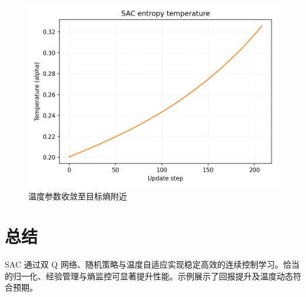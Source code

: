 \documentclass[UTF8,zihao=-4]{ctexart}
\begin{document}
\begin{figure}[H]
  \centering
  \includegraphics[width=0.82\linewidth]{sac_temperature.png}
  \caption{温度参数收敛至目标熵附近}
  \label{fig:sac_temperature_cn}
\end{figure}

\FloatBarrier
\section{总结}
SAC 通过双 Q 网络、随机策略与温度自适应实现稳定高效的连续控制学习。恰当的归一化、经验管理与熵监控可显著提升性能。示例展示了回报提升及温度动态符合预期。
\end{document}

